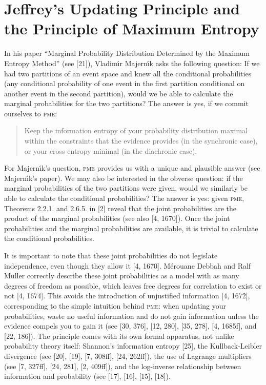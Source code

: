 \documentclass[entropy,article,submit,oneauthor,pdftex,12pt,a4paper]{mdpi}
\newcommand{\qeins}[1]{``#1''}
\newenvironment{quotex}{\begin{quote}\begin{footnotesize}}{\end{footnotesize}\end{quote}}
\begin{document}
\section{Jeffrey's Updating Principle and the Principle of Maximum Entropy}
\label{juppme}

In his paper \qeins{Marginal Probability Distribution Determined by
  the Maximum Entropy Method} (see [21]), Vladim{\'\i}r Majern{\'\i}k
asks the following question: If we had two partitions of an event
space and knew all the conditional probabilities (any conditional
probability of one event in the first partition conditional on another
event in the second partition), would we be able to calculate the
marginal probabilities for the two partitions? The answer is yes, if
we commit ourselves to \textsc{pme}:

\begin{quotex}
  [\textsc{pme}] Keep the information entropy of your probability
  distribution maximal within the constraints that the evidence
  provides (in the synchronic case), or your cross-entropy minimal (in
  the diachronic case).
\end{quotex}

For Majern{\'\i}k's question, \textsc{pme} provides us with a unique
and plausible answer (see Majern{\'\i}k's paper). We may also be
interested in the obverse question: if the marginal probabilities of
the two partitions were given, would we similarly be able to calculate
the conditional probabilities? The answer is yes: given \textsc{pme},
Theorems 2.2.1. and 2.6.5. in [2] reveal that the joint probabilities
are the product of the marginal probabilities (see also [4, 1670]).
Once the joint probabilities and the marginal probabilities are
available, it is trivial to calculate the conditional probabilities.

It is important to note that these joint probabilities do not
legislate independence, even though they allow it [4, 1670].
M{\'e}rouane Debbah and Ralf M{\"u}ller correctly describe these joint
probabilities as a model with as many degrees of freedom as possible,
which leaves free degrees for correlation to exist or not [4, 1674].
This avoids the introduction of unjustified information [4, 1672],
corresponding to the simple intuition behind \textsc{pme}: when
updating your probabilities, waste no useful information and do not
gain information unless the evidence compels you to gain it (see [30,
376], [12, 280], [35, 278], [4, 1685f], and [22, 186]). The principle
comes with its own formal apparatus, not unlike probability theory
itself: Shannon's information entropy [25], the Kullback-Leibler
divergence (see [20], [19], [7, 308ff], [24, 262ff]), the use of
Lagrange multipliers (see [7, 327ff], [24, 281], [2, 409ff]), and the
log-inverse relationship between information and probability (see
[17], [16], [15], [18]).
\end{document}
